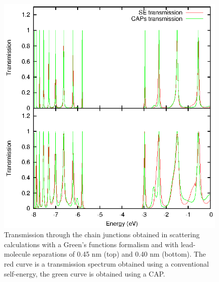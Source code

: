 \begin{figure} 
	\begin{center}
		\includegraphics[width=0.9\linewidth]{figures/figure2a_2b}
	\end{center}
	\caption{Transmission through the chain junctions obtained in
	         scattering calculations with a Green's functions formalism
		 and with lead-molecule separations of 0.45 nm (top) and 0.40
		 nm (bottom). The red curve is a transmission spectrum obtained
		 using a conventional self-energy, the green curve is
		 obtained using a \ac{CAP}.}
	\label{fig:transdat}
\end{figure}

